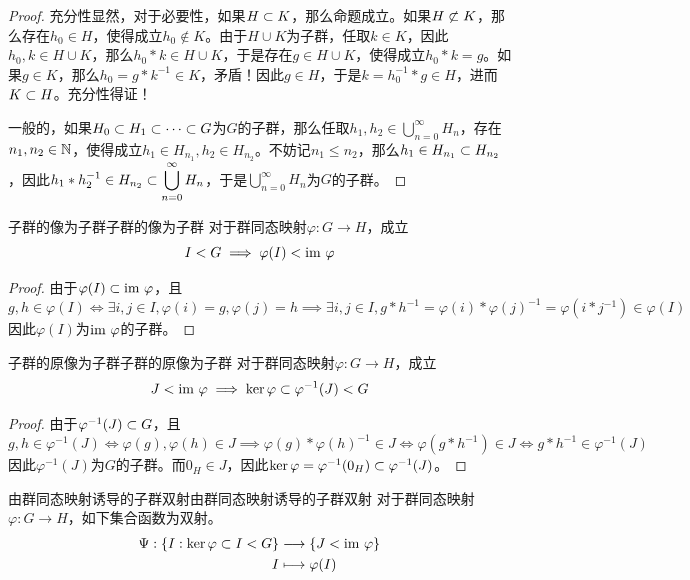 \begin{proof}
	充分性显然，对于必要性，如果$H\subset K$，那么命题成立。如果$H\not\subset K$，那么存在$h_0\in H$，使得成立$h_0\notin K$。由于$H\cup K$为子群，任取$k\in K$，因此$h_0,k\in H\cup K$，那么$h_0*k\in H\cup K$，于是存在$g\in H\cup K$，使得成立$h_0*k=g$。如果$g\in K$，那么$h_0=g*k^{-1}\in K$，矛盾！因此$g\in H$，于是$k=h_0^{-1}*g\in H$，进而$K\subset H$。充分性得证！
	
	一般的，如果$H_0\subset H_1\subset\cdots\subset G$为$G$的子群，那么任取$h_1,h_2\in \displaystyle\bigcup_{n=0}^{\infty}H_n$，存在$n_1,n_2\in\mathbb{N}$，使得成立$h_1\in H_{n_1},h_2\in H_{n_2}$。不妨记$n_1\le n_2$，那么$h_1\in H_{n_1}\subset H_{n_2}$，因此$h_1*h_2^{-1}\in H_{n_2}\subset\displaystyle\bigcup_{n=0}^{\infty}H_n$，于是$\displaystyle\bigcup_{n=0}^{\infty}H_n$为$G$的子群。
\end{proof}

\begin{proposition}{子群的像为子群}{子群的像为子群}
	对于群同态映射$\varphi:G\to H$，成立
	$$
	I<G\implies \varphi(I)<\text{im } \varphi
	$$
\end{proposition}

\begin{proof}
	由于$\varphi(I)\subset\text{im } \varphi$，且
	$$
	g,h\in \varphi(I)
	\iff \exists i,j\in I,\varphi(i)=g,\varphi(j)=h
	\implies \exists i,j\in I,g*h^{-1}=\varphi(i)*\varphi(j)^{-1}=\varphi(i*j^{-1})\in \varphi(I)
	$$
	因此$\varphi(I)$为$\text{im } \varphi$的子群。
\end{proof}

\begin{proposition}{子群的原像为子群}{子群的原像为子群}
	对于群同态映射$\varphi:G\to H$，成立
	$$
	J<\text{im } \varphi\implies \ker\varphi\subset \varphi^{-1}(J)<G
	$$
\end{proposition}

\begin{proof}
	由于$\varphi^{-1}(J)\subset G$，且
	$$
	g,h\in \varphi^{-1}(J)
	\iff \varphi(g),\varphi(h)\in J
	\implies \varphi(g)*\varphi(h)^{-1}\in J
	\iff \varphi(g*h^{-1})\in J
	\iff g*h^{-1} \in \varphi^{-1}(J)
	$$
	因此$\varphi^{-1}(J)$为$G$的子群。而$0_H\in J$，因此$\ker\varphi=\varphi^{-1}(0_H)\subset \varphi^{-1}(J)$。
\end{proof}

\begin{proposition}{由群同态映射诱导的子群双射}{由群同态映射诱导的子群双射}
	对于群同态映射$\varphi:G\to H$，如下集合函数为双射。
	\begin{align*}
		\Psi:\begin{aligned}[t]
			\{ I:\ker\varphi\subset I<G \}&\longrightarrow \{ J<\text{im } \varphi \}\\
			I&\longmapsto \varphi(I)
		\end{aligned}
	\end{align*}
\end{proposition}

